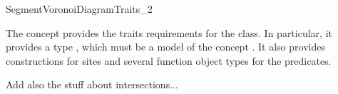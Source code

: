 



\begin{ccRefConcept}{SegmentVoronoiDiagramTraits_2}

\ccDefinition

The concept  provides the traits
requirements for the  class. In particular,
it provides a type , which must be a model of the concept
. It also provides
constructions for sites and several function object
types for the predicates.

{\sc Add also the stuff about intersections...}


\end{ccRefConcept}
